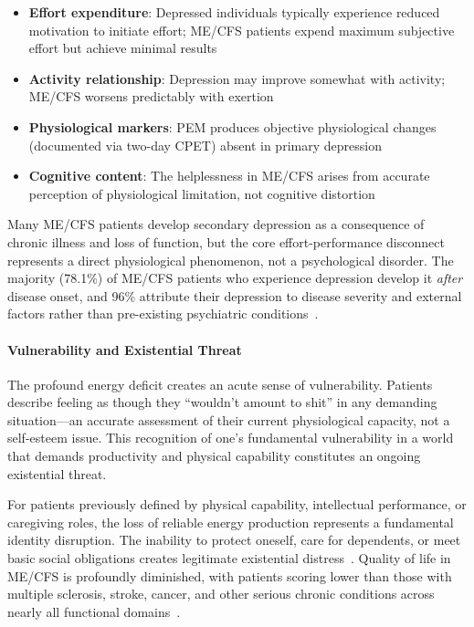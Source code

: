 \begin{itemize}
    \item \textbf{Effort expenditure}: Depressed individuals typically experience reduced motivation to initiate effort; ME/CFS patients expend maximum subjective effort but achieve minimal results
    \item \textbf{Activity relationship}: Depression may improve somewhat with activity; ME/CFS worsens predictably with exertion
    \item \textbf{Physiological markers}: PEM produces objective physiological changes (documented via two-day CPET) absent in primary depression
    \item \textbf{Cognitive content}: The helplessness in ME/CFS arises from accurate perception of physiological limitation, not cognitive distortion~\cite{geraghty2019cognitive}
\end{itemize}

Many ME/CFS patients develop secondary depression as a consequence of chronic illness and loss of function, but the core effort-performance disconnect represents a direct physiological phenomenon, not a psychological disorder. The majority (78.1\%) of ME/CFS patients who experience depression develop it \emph{after} disease onset, and 96\% attribute their depression to disease severity and external factors rather than pre-existing psychiatric conditions~\cite{konig2024mental}.

\paragraph{Vulnerability and Existential Threat}

The profound energy deficit creates an acute sense of vulnerability. Patients describe feeling as though they ``wouldn't amount to shit'' in any demanding situation---an accurate assessment of their current physiological capacity, not a self-esteem issue. This recognition of one's fundamental vulnerability in a world that demands productivity and physical capability constitutes an ongoing existential threat.

For patients previously defined by physical capability, intellectual performance, or caregiving roles, the loss of reliable energy production represents a fundamental identity disruption. The inability to protect oneself, care for dependents, or meet basic social obligations creates legitimate existential distress~\cite{fennell2021elements}. Quality of life in ME/CFS is profoundly diminished, with patients scoring lower than those with multiple sclerosis, stroke, cancer, and other serious chronic conditions across nearly all functional domains~\cite{hvidberg2015quality,kingdon2018functional}.

